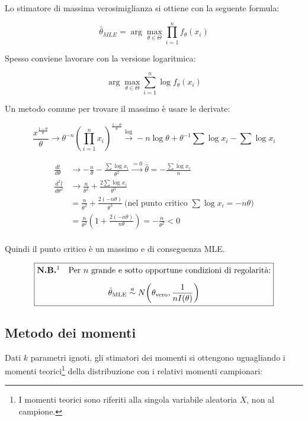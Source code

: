 \documentclass{article}
\begin{document}
Lo stimatore di massima verosimiglianza si ottiene con la seguente formula:

$$\hat{\theta}_{MLE}=\arg\max_{\theta\in\Theta}\prod_{i=1}^{n} f_{\theta}(x_i)$$

Spesso conviene lavorare con la versione logaritmica:

$$\arg\max_{\theta\in\Theta}\sum_{i=1}^{n}\log f_{\theta}(x_i)$$

\vspace{10pt}

Un metodo comune per trovare il massimo è usare le derivate:

$$\frac{x^{\frac{1-\theta}{\theta}}}{\theta}\rightarrow\theta^{-n}(\prod_{i=1}^{n}x_i)^{\frac{1-\theta}{\theta}}\overset{\text{log}}{\longrightarrow}-n\log{\theta}+\theta^{-1}\sum\log{x_i}-\sum\log{x_i}$$

\begin{align*}
    \frac{dl}{d\theta} &\rightarrow-\frac{n}{\theta}-\frac{\sum\log{x_i}}{\theta^2}\overset{=0}{\longrightarrow}\hat{\theta}=-\frac{\sum\log{x_i}}{n}\\
    \frac{d^2l}{d\theta^2} &\rightarrow\frac{n}{\theta^2}+\frac{2\sum\log{x_i}}{\theta^3}\\
    &=  \frac{n}{\theta^2}+\frac{2(-n\theta)}{\theta^3}\ \text{(nel punto critico } \sum\log{x_i}=-n\theta)\\
    &= \frac{n}{\theta^2}\left(1+\frac{2(-n\theta)}{n\theta}\right) = -\frac{n}{\theta^2}<0\\
\end{align*}

Quindi il punto critico è un massimo e di conseguenza MLE.\newline

\[
\boxed{
\begin{gathered}
\textbf{N.B.\footnotemark}\quad
\text{Per $n$ grande e sotto opportune condizioni di regolarità:}\\[0.5em]
\hat{\theta}_{\mathrm{MLE}}
\overset{a}{\sim}
N\!\left(\theta_{\text{vero}},\frac{1}{nI(\theta)}\right)
\end{gathered}
}
\]


\newpage

\subsection{Metodo dei momenti}

Dati $k$ parametri ignoti, gli stimatori dei momenti si ottengono uguagliando i momenti teorici\footnote{I momenti teorici sono riferiti alla singola variabile aleatoria $X$, non al campione.} della distribuzione con i relativi momenti campionari:
\end{document}
